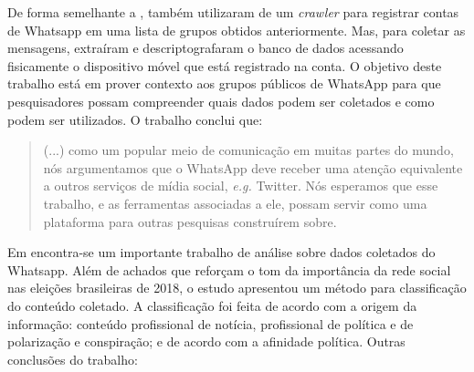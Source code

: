 
De forma semelhante a ,  também utilizaram de um \textit{crawler} para registrar contas de Whatsapp em uma lista de grupos obtidos anteriormente. Mas, para coletar as mensagens,  extraíram e descriptografaram o banco de dados acessando fisicamente o dispositivo móvel que está registrado na conta. O objetivo deste trabalho está em prover contexto aos grupos públicos de WhatsApp para que pesquisadores possam compreender quais dados podem ser coletados e como podem ser utilizados. O trabalho conclui que:

\begin{quote}
    (...) como um popular meio de comunicação em muitas partes do mundo, nós argumentamos que o WhatsApp deve receber uma atenção equivalente a outros serviços de mídia social, \textit{e.g.} Twitter. Nós esperamos que esse trabalho, e as ferramentas associadas a ele, possam servir como uma plataforma para outras pesquisas construírem sobre.
    \cite[p.~387, tradução nossa]{garimella2018whatapp}
    
\end{quote}




Em  encontra-se um importante trabalho de análise sobre dados coletados do Whatsapp. Além de achados que reforçam o tom da importância da rede social nas eleições brasileiras de 2018, o estudo apresentou um método para classificação do conteúdo coletado. A classificação foi feita de acordo com a origem da informação: conteúdo profissional de notícia, profissional de política e de polarização e conspiração; e de acordo com a afinidade política. Outras conclusões do trabalho:

